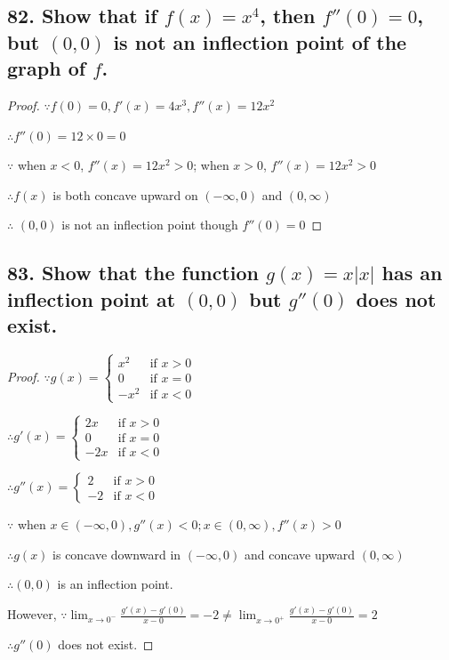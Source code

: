 \documentclass{article}
\begin{document}
    \subsection*{82. Show that if $f(x) = x^4$, then $f''(0) = 0$, but $(0, 0)$ is not an inflection point of the graph of $f$.}

    \begin{proof}
        $\because f(0) = 0, f'(x) = 4x^3, f''(x) = 12x^2$

        $\therefore f''(0) = 12 \times 0 = 0$

        $\because$ when $x < 0$, $f''(x) = 12x^2 > 0$; when $x > 0$, $f''(x) = 12x^2 > 0$

        $\therefore f(x)$ is both concave upward on $(-\infty, 0)$ and $(0, \infty)$ 

        $\therefore$ $(0,0)$ is not an inflection point though $f''(0) = 0$
    \end{proof}

    \subsection*{83. Show that the function $g(x) = x |x|$ has an inflection point at $(0,0)$ but $g''(0)$ does not exist.}
    
    \begin{proof}
        $\because g(x) = \left\{ \begin{array}{ll}
            x^2 & \textrm{if $x > 0$} \\
            0 & \textrm{if $x = 0$} \\
            -x^2 & \textrm{if $x < 0$}
        \end{array} \right.$

        $\therefore g'(x) = \left\{ \begin{array}{ll}
            2x & \textrm{if $x > 0$} \\
            0 & \textrm{if $x = 0$} \\
            -2x & \textrm{if $x < 0$}
        \end{array} \right.$

        $\therefore g''(x) = \left\{ \begin{array}{ll}
            2 & \textrm{if $x > 0$} \\
            -2 &\textrm{if $x < 0$}
        \end{array} \right.$

        $\because$ when $x \in (-\infty, 0), g''(x) < 0; x \in (0, \infty), f''(x) > 0$

        $\therefore g(x)$ is concave downward in $(-\infty, 0)$ and concave upward $(0, \infty)$

        $\therefore (0, 0)$ is an inflection point.

        However, $\because \lim_{x \to 0^-}\frac{g'(x) - g'(0)}{x - 0} = -2 \not = \lim_{x \to 0^+}\frac{g'(x) - g'(0)}{x - 0} = 2$

        $\therefore g''(0)$ does not exist.

    \end{proof}
\end{document}
